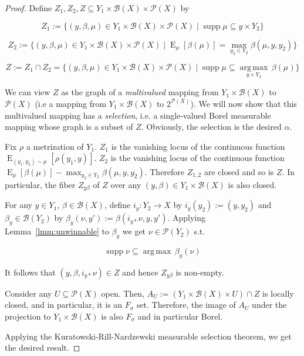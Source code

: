 \documentclass[11pt]{article}
\theoremstyle{definition}
\theoremstyle{plain}
\newcommand{\Argmax}[1]{\underset{#1}{\operatorname{arg\,max}}\,}
\DeclareMathOperator{\E}{E}
\newcommand{\PM}{\mathcal{P}}
\DeclareMathOperator{\Sp}{supp}
\newcommand{\Gm}{\mathcal{B}}
\begin{document}
\begin{proof}

Define ${Z_1, Z_2, Z \subseteq Y_1 \times \Gm\left(X\right) \times \PM\left(X\right)}$ by

$${Z_1:=\{\left(y,\beta,\mu\right) \in Y_1 \times \Gm\left(X\right) \times \PM\left(X\right) \mid \Sp \mu \subseteq y \times Y_2\}}$$

$${Z_2:=\{\left(y,\beta,\mu\right) \in Y_1 \times \Gm\left(X\right) \times \PM\left(X\right) \mid \E_\mu[\beta\left(\mu\right)] = \max_{y_2 \in Y_2} \beta\left(\mu,y,y_2\right)\}}$$

$${Z:=Z_1 \cap Z_2 =\{\left(y,\beta,\mu\right) \in Y_1 \times \Gm\left(X\right) \times \PM\left(X\right) \mid \Sp \mu \subseteq \Argmax{y \times Y_2} \beta\left(\mu\right)\}}$$

We can view ${Z}$ as the graph of a \emph{multivalued} mapping from ${Y_1 \times \Gm\left(X\right)}$ to ${\PM\left(X\right)}$ (i.e a mapping from ${Y_1 \times \Gm\left(X\right)}$ to $2^{\PM\left(X\right)}$). We will now show that this multivalued mapping has a \emph{selection}, i.e. a single-valued Borel measurable mapping whose graph is a subset of $Z$. Obviously, the selection is the desired ${\alpha}$.

Fix $\rho$ a metrization of $Y_1$. $Z_1$ is the vanishing locus of the continuous function $\E_{\left(y_1, y_2\right) \sim \mu}[\rho\left(y_1,y\right)]$. $Z_2$ is the vanishing locus of the continuous function $\E_\mu[\beta\left(\mu\right)] - \max_{y_2 \in Y_2} \beta\left(\mu,y,y_2\right)$. Therefore $Z_{1,2}$ are closed and so is $Z$. In particular, the fiber ${Z_{y\beta}}$ of ${Z}$ over any ${\left(y,\beta\right) \in Y_1 \times \Gm\left(X\right)}$ is also closed. 

For any ${y \in Y_1}$, ${\beta \in \Gm\left(X\right)}$, define ${i_y: Y_2 \rightarrow X}$ by ${i_y\left(y_2\right):=\left(y,y_2\right)}$ and ${\beta_y \in \Gm\left(Y_{2}\right)}$ by $\beta_y\left(\nu,y'\right):=\beta\left(i_{y*}\nu,y,y'\right)$. Applying Lemma~\ref{lmm:unwinnable} to ${\beta_y}$ we get ${\nu \in \PM\left(Y_2\right)}$ s.t.

$$\Sp \nu \subseteq \Argmax{} \beta_y\left(\nu\right)$$

It follows that ${\left(y,\beta,i_{y*}\nu\right) \in Z}$ and hence ${Z_{y\beta}}$ is non-empty.

Consider any ${U \subseteq \PM\left(X\right)}$ open. Then, ${A_U:=\left(Y_{1} \times \Gm\left(X\right) \times U\right) \cap Z}$ is locally closed, and in particular, it is an ${F_\sigma}$ set. Therefore, the image of ${A_U}$ under the projection to ${Y_{1} \times \Gm\left(X\right)}$ is also ${F_\sigma}$ and in particular Borel. 

Applying the Kuratowski-Rill-Nardzewski measurable selection theorem, we get the desired result.
\end{proof}
\end{document}
